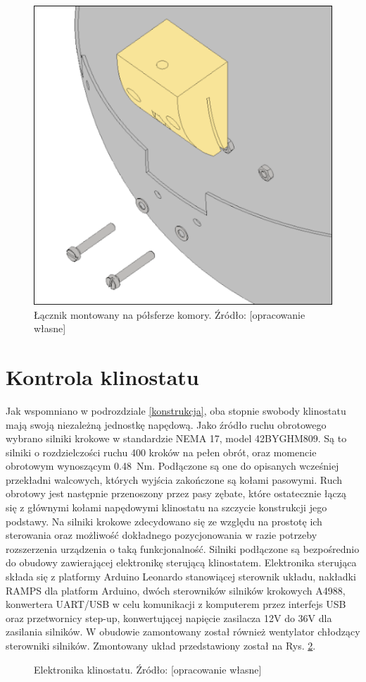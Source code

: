 \begin{figure}
	
	\centering
	\includegraphics[scale=.25]{bottom_half_connector_framed}
	\caption{Łącznik montowany na półsferze komory. Źródło: [opracowanie własne]} 
	\label{fig:łącznik_globus}
	
\end{figure}

\section{Kontrola klinostatu}

Jak wspomniano w podrozdziale \ref{konstrukcja}, oba stopnie swobody klinostatu mają swoją niezależną jednostkę napędową. Jako źródło ruchu obrotowego wybrano silniki krokowe w standardzie NEMA 17, model 42BYGHM809. Są to silniki o rozdzielczości ruchu 400 kroków na pełen obrót, oraz momencie obrotowym wynoszącym \SI{0,48}{Nm}. Podłączone są one do opisanych wcześniej przekładni walcowych, których wyjścia zakończone są kołami pasowymi. Ruch obrotowy jest następnie przenoszony przez pasy zębate, które ostatecznie łączą się z głównymi kołami napędowymi klinostatu na szczycie konstrukcji jego podstawy. Na silniki krokowe zdecydowano się ze względu na prostotę ich sterowania oraz możliwość dokładnego pozycjonowania w razie potrzeby rozszerzenia urządzenia o taką funkcjonalność. Silniki podłączone są bezpośrednio do obudowy zawierającej elektronikę sterującą klinostatem. Elektronika sterująca składa się z platformy Arduino Leonardo stanowiącej sterownik układu, nakładki RAMPS dla platform Arduino, dwóch sterowników silników krokowych A4988, konwertera UART/USB w celu komunikacji z komputerem przez interfejs USB oraz przetwornicy step-up, konwertującej napięcie zasilacza 12V do 36V dla zasilania silników. W obudowie zamontowany został również wentylator chłodzący sterowniki silników. Zmontowany układ przedstawiony został na Rys. \ref{fig:elektronika}. 

\begin{figure}[ht]
	\centering
	\setlength{\fboxsep}{0pt}
	\setlength{\fboxrule}{1pt}
	\caption{Elektronika klinostatu. Źródło: [opracowanie własne]} 
	\label{fig:elektronika}
\end{figure}
